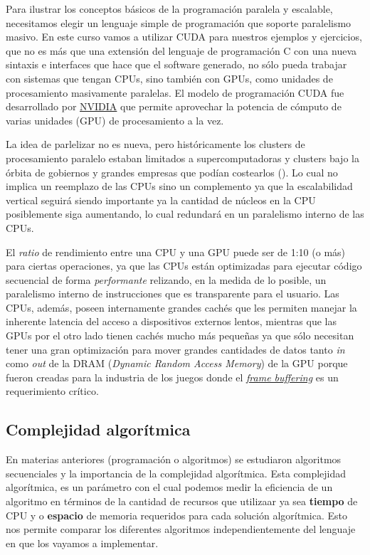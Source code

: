 Para ilustrar los conceptos básicos de la programación paralela y escalable, necesitamos elegir un lenguaje simple de
programación que soporte paralelismo masivo. En este curso vamos a utilizar CUDA para nuestros ejemplos y ejercicios,
que no es más que una extensión del lenguaje de programación C con una nueva sintaxis e interfaces que hace que el
software generado, no sólo pueda trabajar con sistemas que tengan CPUs, sino también con GPUs, como unidades de
procesamiento masivamente paralelas. El modelo de programación CUDA fue desarrollado por
\href{https://www.nvidia.com/es-la/}{NVIDIA} que permite aprovechar la potencia de cómputo de varias unidades (GPU) de
procesamiento a la vez.

La idea de parlelizar no es nueva, pero históricamente los clusters de procesamiento paralelo estaban limitados a
supercomputadoras y clusters bajo la órbita de gobiernos y grandes empresas que podían costearlos
(\textcite{sutter2005}). Lo cual no implica un reemplazo de las CPUs sino un complemento ya que la escalabilidad
vertical seguirá siendo importante ya la cantidad de núcleos en la CPU posiblemente siga aumentando, lo cual redundará
en un paralelismo interno de las CPUs.

El \textit{ratio} de rendimiento entre una CPU y una GPU puede ser de 1:10 (o más) para ciertas operaciones, ya que las
CPUs están optimizadas para ejecutar código secuencial de forma \textit{performante} relizando, en la medida de lo
posible, un paralelismo interno de instrucciones que es transparente para el usuario. Las CPUs, además, poseen
internamente grandes cachés que les permiten manejar la inherente latencia del acceso a dispositivos externos lentos,
mientras que las GPUs por el otro lado tienen cachés mucho más pequeñas ya que sólo necesitan tener una gran
optimización para mover grandes cantidades de datos tanto \textit{in} como \textit{out} de la DRAM (\textit{Dynamic
Random Access Memory}) de la GPU porque fueron creadas para la industria de los juegos donde el
\href{https://www.youtube.com/shorts/8wj3zVA03WQ}{\textit{frame buffering}} es un requerimiento crítico.

\subsection{Complejidad algorítmica}

En materias anteriores (programación o algoritmos) se estudiaron algoritmos secuenciales y la importancia de la
complejidad algorítmica. Esta complejidad algorítmica, es un parámetro con el cual podemos medir la eficiencia de un
algoritmo en términos de la cantidad de recursos que utilizaar ya sea \textbf{tiempo} de CPU y o \textbf{espacio} de
memoria requeridos para cada solución algorítmica. Esto nos permite comparar los diferentes algoritmos
independientemente del lenguaje en que los vayamos a implementar.

